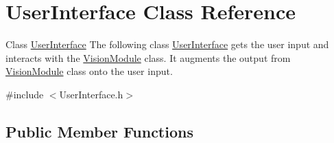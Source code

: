 \hypertarget{classUserInterface}{}\section{User\+Interface Class Reference}
\label{classUserInterface}


Class \hyperlink{classUserInterface}{User\+Interface} The following class \hyperlink{classUserInterface}{User\+Interface} gets the user input and interacts with the \hyperlink{classVisionModule}{Vision\+Module} class. It augments the output from \hyperlink{classVisionModule}{Vision\+Module} class onto the user input.  




{\ttfamily \#include $<$User\+Interface.\+h$>$}

\subsection*{Public Member Functions}
